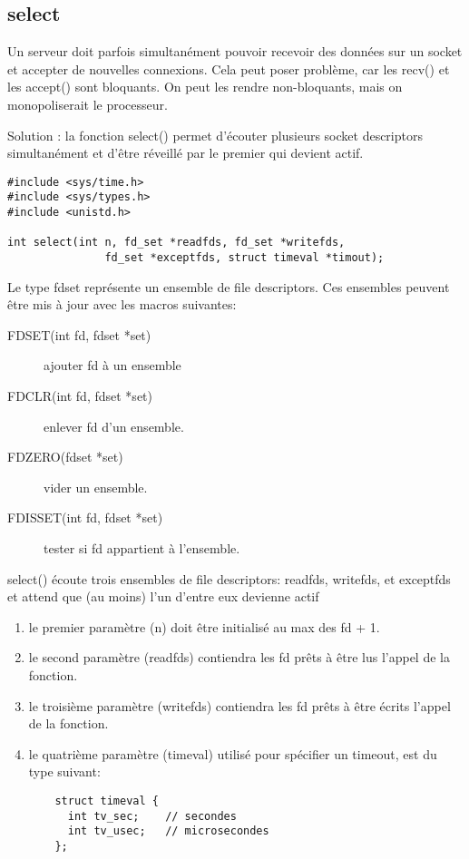 \documentclass[a4paper]{article}
\begin{document}
\subsection{select}
Un serveur doit parfois simultanément pouvoir recevoir des données sur un socket et accepter de nouvelles connexions. Cela peut poser problème, car les recv() et les accept() sont bloquants. On peut les rendre non-bloquants, mais on monopoliserait le processeur.\par
Solution : la fonction select() permet d'écouter plusieurs socket descriptors simultanément et d'être réveillé par le premier qui devient actif.
\begin{lstlisting}
#include <sys/time.h>
#include <sys/types.h>
#include <unistd.h>

int select(int n, fd_set *readfds, fd_set *writefds,
               fd_set *exceptfds, struct timeval *timout);
\end{lstlisting}
Le type fd\textunderscore{}set représente un ensemble de file descriptors. Ces ensembles peuvent être mis à jour avec les macros suivantes:
\begin{description}
  \item [FD\textunderscore{}SET(int fd, fd\textunderscore{}set *set)] ajouter fd à un ensemble
  \item [FD\textunderscore{}CLR(int fd, fd\textunderscore{}set *set)] enlever fd d'un ensemble.
  \item [FD\textunderscore{}ZERO(fd\textunderscore{}set *set)] vider un ensemble.
  \item [FD\textunderscore{}ISSET(int fd, fd\textunderscore{}set *set)] tester si fd appartient à l'ensemble.
\end{description}
select() écoute trois ensembles de file descriptors: readfds, writefds, et exceptfds et attend que (au moins) l’un d’entre eux devienne actif
\begin{enumerate}
  \item le premier paramètre (n) doit être initialisé au max des fd + 1.
  \item le second paramètre (readfds) contiendra les fd prêts à être lus l’appel de la fonction.
  \item le troisième paramètre (writefds) contiendra les fd prêts à être écrits l’appel de la fonction.
  \item le quatrième paramètre (timeval) utilisé pour spécifier un timeout, est du type suivant:
  \begin{lstlisting}
    struct timeval {
      int tv_sec;    // secondes
      int tv_usec;   // microsecondes
    };
  \end{lstlisting}
\end{enumerate}
\end{document}
